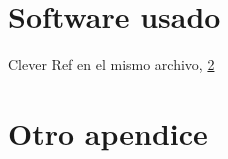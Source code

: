 \documentclass[../thesis/thesis.tex]{subfiles}
\begin{document}
\appendix

\appendixpage%
\addappheadtotoc%


\section{Software usado}

Clever Ref en el mismo archivo, \cref{sec:app:2}


\section{Otro apendice}\label{sec:app:2}
\end{document}
